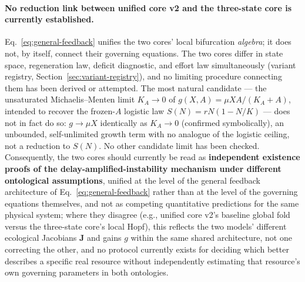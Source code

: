 \documentclass[twocolumn,10pt]{article}
\begin{document}
\paragraph{No reduction link between unified core v2 and the three-state core is currently established.} Eq.~\eqref{eq:general-feedback} unifies the two cores' local bifurcation \emph{algebra}; it does not, by itself, connect their governing equations. The two cores differ in state space, regeneration law, deficit diagnostic, and effort law simultaneously (variant registry, Section~\ref{sec:variant-registry}), and no limiting procedure connecting them has been derived or attempted. The most natural candidate --- the unsaturated Michaelis--Menten limit $K_A\to0$ of $g(X,A)=\mu X A/(K_A+A)$, intended to recover the frozen-$A$ logistic law $S(N)=rN(1-N/K)$ --- does not in fact do so: $g\to\mu X$ identically as $K_A\to0$ (confirmed symbolically), an unbounded, self-unlimited growth term with no analogue of the logistic ceiling, not a reduction to $S(N)$. No other candidate limit has been checked. Consequently, the two cores should currently be read as \textbf{independent existence proofs of the delay-amplified-instability mechanism under different ontological assumptions}, unified at the level of the general feedback architecture of Eq.~\eqref{eq:general-feedback} rather than at the level of the governing equations themselves, and not as competing quantitative predictions for the same physical system; where they disagree (e.g., unified core v2's baseline global fold versus the three-state core's local Hopf), this reflects the two models' different ecological Jacobians $\mathbf J$ and gains $g$ within the same shared architecture, not one correcting the other, and no protocol currently exists for deciding which better describes a specific real resource without independently estimating that resource's own governing parameters in both ontologies.
\end{document}
